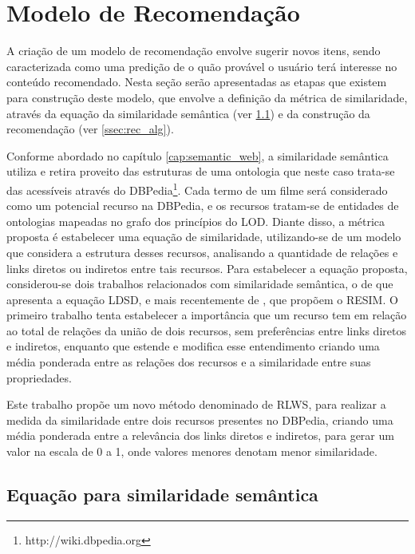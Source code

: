 \section{Modelo de Recomendação}
\label{ssec:sim_rec}

A criação de um modelo de recomendação envolve sugerir novos itens, sendo caracterizada como uma predição de o quão provável o usuário terá interesse no conteúdo recomendado. Nesta seção serão apresentadas as etapas que existem para construção deste modelo, que envolve a definição da métrica de similaridade, através da equação da similaridade semântica (ver \ref{ssec:formula_rlws}) e da construção da recomendação (ver \ref{ssec:rec_alg}).

Conforme abordado no capítulo \ref{cap:semantic_web}, a similaridade semântica utiliza e retira proveito das estruturas de uma ontologia que neste caso trata-se das acessíveis através do DBPedia\footnote{http://wiki.dbpedia.org}. Cada termo de um filme será considerado como um potencial recurso na DBPedia, e os recursos tratam-se de entidades de ontologias mapeadas no grafo dos princípios do \ac{LOD}. Diante disso, a métrica proposta é estabelecer uma equação de similaridade, utilizando-se de um modelo que considera a estrutura desses recursos, analisando a quantidade de relações e links diretos ou indiretos entre tais recursos. Para estabelecer a equação proposta, considerou-se dois trabalhos relacionados com similaridade semântica, o de \cite{PassantLDSD} que apresenta a equação \ac{LDSD}, e mais recentemente de \cite{PiaoResim}, que propõem o \ac{RESIM}. O primeiro trabalho tenta estabelecer a importância que um recurso tem em relação ao total de relações da união de dois recursos, sem preferências entre links diretos e indiretos, enquanto que \cite{PiaoResim} estende e modifica esse entendimento criando uma média ponderada entre as relações dos recursos e a similaridade entre suas propriedades.

Este trabalho propõe um novo método denominado de \ac{RLWS}, para realizar a medida da similaridade entre dois recursos presentes no DBPedia, criando uma média ponderada entre a relevância dos links diretos e indiretos, para gerar um valor na escala de 0 a 1, onde valores menores denotam menor similaridade.

\subsection{Equação para similaridade semântica}
\label{ssec:formula_rlws}

